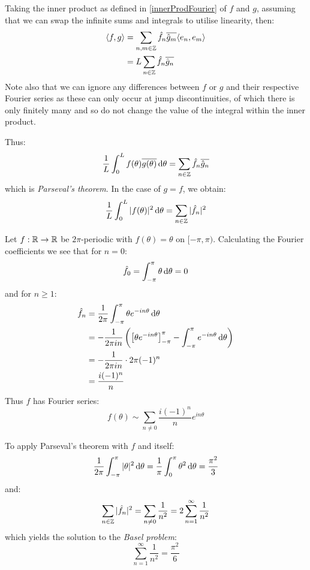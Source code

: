 \documentclass[../main.tex]{subfiles}
\begin{document}
Taking the inner product as defined in \cref{innerProdFourier} of $f$ and $g$, assuming that we can swap the infinite sums and integrals to utilise linearity, then:
\begin{align*}
  \langle f, g \rangle &= \sum_{n, m \in \mathbb{Z}} \hat{f}_n \overline{\hat{g}_m} \langle e_n, e_m \rangle \\
                       &= L \sum_{n \in \mathbb{Z}} \hat{f}_n \overline{\hat{g}_n}
\end{align*}
Note also that we can ignore any differences between $f$ or $g$ and their respective Fourier series as these can only occur at jump discontinuities, of which there is only finitely many and so do not change the value of the integral within the inner product.

Thus:
\[
  \frac{1}{L} \int_{0}^{L} f(\theta) \overline{g(\theta)} \d{\theta} = \sum_{n \in \Z} \hat{f}_n \overline{\hat{g}_n}
\]
which is \textit{Parseval's theorem}.
In the case of $g = f$, we obtain:
\[
  \frac{1}{L} \int_{0}^{L} |f(\theta)|^2 \d{\theta} = \sum_{n \in \Z} |\hat{f}_n|^2
\]
\begin{example}
  Let $f: \mathbb{R} \to \mathbb{R}$ be $2\pi$-periodic with $f(\theta) = \theta$ on $[-\pi, \pi)$.
  Calculating the Fourier coefficients we see that for $n = 0$:
  \[
    \hat{f}_0 = \int_{-\pi}^{\pi} \theta \d{\theta} = 0
  \]
  and for $n \geq 1$:
  \begin{align*}
    \hat{f}_n &= \frac{1}{2\pi} \int_{-\pi}^{\pi} \theta e^{-i n \theta} \d{\theta} \\
              &= -\frac{1}{2\pi i n}\left(\eval{\theta e^{-in\theta}}{-\pi}{\pi} - \int_{-\pi}^{\pi} e^{-i n \theta} \d{\theta}\right) \\
              &= -\frac{1}{2 \pi i n} \cdot 2 \pi (-1)^n \\
              &= \frac{i(-1)^n}{n}
  \end{align*}
  Thus $f$ has Fourier series:
  \[
    f(\theta) \sim \sum_{n \neq 0} \frac{i(-1)^{n}}{n} e^{i n \theta}
  \]

  To apply Parseval's theorem with $f$ and itself:
  \[
    \frac{1}{2\pi} \int_{-\pi}^{\pi} |\theta|^2 \d{\theta} = \frac{1}{\pi} \int_{0}^{\pi} \theta^2 \d{\theta} = \frac{\pi^2}{3}
  \]
  and:
  \[
    \sum_{n \in \mathbb{Z}} |\hat{f}_n|^2 = \sum_{n \neq 0} \frac{1}{n^2} = 2 \sum_{n = 1}^{\infty} \frac{1}{n^2}
  \]
  which yields the solution to the \textit{Basel problem}:
  \[
    \sum_{n = 1}^{\infty} \frac{1}{n^2} = \frac{\pi^2}{6}
  \]
\end{example}
\end{document}

